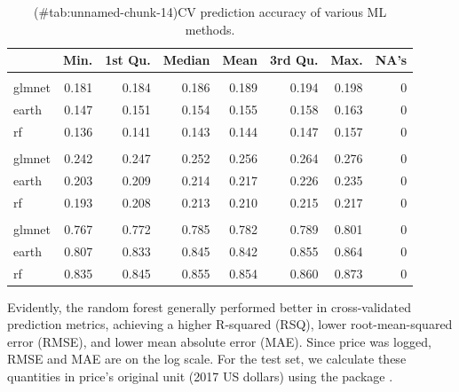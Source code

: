 \begin{Schunk}
\begin{table}

\caption{(\#tab:unnamed-chunk-14)CV prediction accuracy of various ML methods.}
\centering
\begin{tabular}[t]{lrrrrrrr}
\toprule
  & Min. & 1st Qu. & Median & Mean & 3rd Qu. & Max. & NA's\\
\midrule
\addlinespace[0.3em]
\multicolumn{8}{l}{\textbf{MAE}}\\
\hspace{1em}glmnet & 0.181 & 0.184 & 0.186 & 0.189 & 0.194 & 0.198 & 0\\
\hspace{1em}earth & 0.147 & 0.151 & 0.154 & 0.155 & 0.158 & 0.163 & 0\\
\hspace{1em}rf & 0.136 & 0.141 & 0.143 & 0.144 & 0.147 & 0.157 & 0\\
\addlinespace[0.3em]
\multicolumn{8}{l}{\textbf{RMSE}}\\
\hspace{1em}glmnet & 0.242 & 0.247 & 0.252 & 0.256 & 0.264 & 0.276 & 0\\
\hspace{1em}earth & 0.203 & 0.209 & 0.214 & 0.217 & 0.226 & 0.235 & 0\\
\hspace{1em}rf & 0.193 & 0.208 & 0.213 & 0.210 & 0.215 & 0.217 & 0\\
\addlinespace[0.3em]
\multicolumn{8}{l}{\textbf{RSQ}}\\
\hspace{1em}glmnet & 0.767 & 0.772 & 0.785 & 0.782 & 0.789 & 0.801 & 0\\
\hspace{1em}earth & 0.807 & 0.833 & 0.845 & 0.842 & 0.855 & 0.864 & 0\\
\hspace{1em}rf & 0.835 & 0.845 & 0.855 & 0.854 & 0.860 & 0.873 & 0\\
\bottomrule
\end{tabular}
\end{table}

\end{Schunk}

Evidently, the random forest generally performed better in
cross-validated prediction metrics, achieving a higher R-squared (RSQ),
lower root-mean-squared error (RMSE), and lower mean absolute error
(MAE). Since price was logged, RMSE and MAE are on the log scale. For
the test set, we calculate these quantities in price's original unit
(2017 US dollars) using the  package
\citep{yardstick}.

